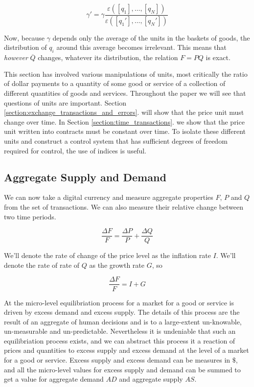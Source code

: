 \begin{equation}
    \gamma' =  \gamma \frac {\varepsilon \left( \left[ q_1 \right], \dots, \left[ q_N \right] \right)}
    {\varepsilon \left( \left[ {q_1}' \right], \dots, \left[ {q_N}' \right] \right)}
\end{equation}

Now, because $\gamma$ depends only the average of the units in the baskets of goods, the distribution of
$q_i$ around this average becomes irrelevant. This means that \textit{however} $\overline Q$
changes, whatever its distribution, the relation $F=PQ$ is exact.  

This section has involved various manipulations of units, most critically the ratio of dollar
payments to a quantity of some good or service of a collection of different quantities of goods and
services. Throughout the paper we will see that questions of units are important. Section
\ref{section:exchange_transactions_and_errors}. will show that the price unit must change over
time. In Section \ref{section:time_transactions}. we show that the price unit written into
contracts must be constant over time. To isolate these different units and construct a control
system that has sufficient degrees of freedom required for control, the use of indices is useful.

\subsection{Aggregate Supply and Demand}
\label{section:aggregate_supply_and_demand}

We can now take a digital currency and measure aggregate properties $F$, $P$ and $Q$ from the set of
transactions. We can also measure their relative change between two time periods.

\[
    \frac {\Delta F} F = \frac {\Delta P} P + \frac {\Delta Q} Q
\]

We'll denote the rate of change of the price level as the inflation rate $I$. We'll denote the rate
of rate of $Q$ as the growth rate $G$, so

\[
    \frac {\Delta F} F = I + G
\]

At the micro-level equilibriation process for a market for a good or service is driven by excess
demand and excess supply. The details of this process are the result of an aggregate of human
decisions and is to a large-extent un-knowable, un-measurable and un-predictable. Nevertheless it is
undeniable that such an equilibriation process exists, and we can abstract this process it a
reaction of prices and quantities to excess supply and excess demand at the level of a market for a
good or service. Excess supply and excess demand can be measures in $\$$, and all the micro-level
values for excess supply and demand can be summed to get a value for aggregate demand $AD$ and
aggregate supply $AS$.  

